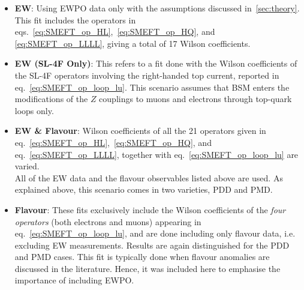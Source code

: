 \begin{itemize}
	\setlength\itemsep{0em}
	\item {\bf EW}: 
	Using EWPO data only with the assumptions discussed in~\autoref{sec:theory}. This fit includes the operators in eqs.~\eqref{eq:SMEFT_op_HL},~\eqref{eq:SMEFT_op_HQ}, and \eqref{eq:SMEFT_op_LLLL},  giving a total of 17 Wilson coefficients.
	\item  {\bf EW (SL-4F Only)}: This refers to a fit done with the Wilson coefficients of the { SL-4F operators} involving the right-handed top current, reported in eq.~\eqref{eq:SMEFT_op_loop_lu}. This scenario assumes that BSM enters the modifications of the $Z$ couplings to muons and electrons through top-quark loops only.
	\item {\bf EW \& Flavour}: Wilson coefficients of all the { 21 operators} given in eq.~\eqref{eq:SMEFT_op_HL},~\eqref{eq:SMEFT_op_HQ}, and eq.~\eqref{eq:SMEFT_op_LLLL}, together with eq.~\eqref{eq:SMEFT_op_loop_lu} are varied.\\
	All of the EW data and the flavour observables listed above are used. As explained above, this scenario comes in two varieties, PDD and PMD.
	\item {\bf Flavour}: These fits exclusively include the Wilson coefficients of the {\em four operators} (both electrons and muons) appearing in eq.~\eqref{eq:SMEFT_op_loop_lu}, and are done including only flavour data, i.e. excluding EW measurements. Results are again distinguished for the PDD and PMD cases. This fit is typically done when flavour anomalies are discussed in the literature. Hence, it was included here to emphasise the importance of including EWPO.
\end{itemize}
